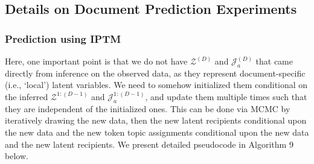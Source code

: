       \subsection{Details on Document Prediction Experiments}\label{subsec:Details on PPE}    
       \subsubsection{Prediction using IPTM} \label{subsubsec: IPTM PPE}
        Here, one important point is that we do not have $\mathcal{Z}^{(D)}$ and $\mathcal{J}_a^{(D)}$ that came directly from inference on the observed data, as they represent document-specific (i.e., `local') latent variables. We need to somehow initialized them conditional on the inferred $\mathcal{Z}^{1:(D-1)}$ and $\mathcal{J}_a^{1:(D-1)}$, and update them multiple times such that they are independent of the initialized ones. This can be done via MCMC by iteratively drawing the new data, then the new latent recipients conditional upon the new data and the new token topic assignments conditional upon the new data and the new latent recipients. We present detailed pseudocode in Algorithm 9 below.

